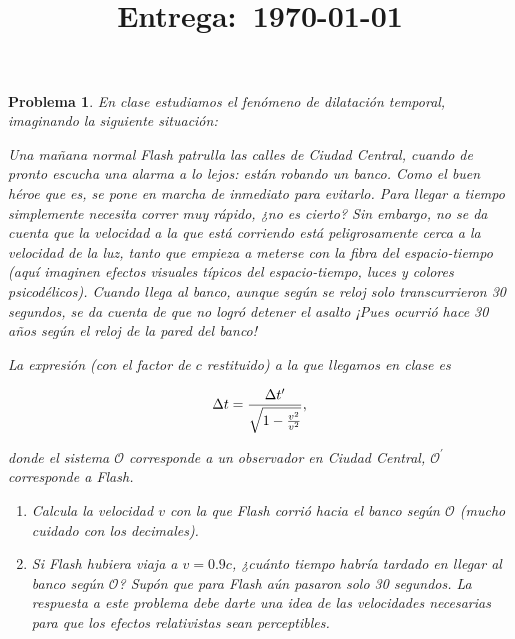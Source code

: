 \documentclass[12pt]{article}
\title{
    \textbf{\homeworknumber}\\
    \normalsize\vspace{0.1in}\small{\textbf{Entrega}:~\today}
    \vspace{-1.5in}
}
\author{}
\date{}
\theoremstyle{break}
\newtheorem{exercise}{Problema}
\theoremstyle{nonumberbreak}
\newcommand*{\observer}{\mathcal{O}}
\newcommand*{\primeobserver}{\mathcal{O}^{\prime}}
\begin{document}
    \maketitle
    \thispagestyle{fancy}
    
    \begin{exercise}
        En clase estudiamos el fenómeno de dilatación temporal, imaginando la siguiente situación:\par

        Una mañana normal Flash patrulla las calles de Ciudad Central, cuando de pronto escucha una alarma a lo lejos: están robando un banco. Como el buen héroe que es, se pone en marcha de inmediato para evitarlo. Para llegar a tiempo simplemente necesita correr muy rápido, ¿no es cierto? Sin embargo, no se da cuenta que la velocidad a la que está corriendo está peligrosamente cerca a la velocidad de la luz, tanto que empieza a meterse con la fibra del espacio-tiempo (aquí imaginen efectos visuales típicos del espacio-tiempo, luces y colores psicodélicos). Cuando llega al banco, aunque según se reloj solo transcurrieron 30 segundos, se da cuenta de que no logró detener el asalto ¡Pues ocurrió hace 30 años según el reloj de la pared del banco!\par

        La expresión (con el factor de \(c\) restituido) a la que llegamos en clase es

        \begin{equation*}
            \change{t} = \dfrac{\change*{t}}{\sqrt{1 - \frac{v^{2}}{v^{2}}}},
        \end{equation*}

        donde el sistema \(\observer\) corresponde a un observador en Ciudad Central, \(\primeobserver\) corresponde a Flash.

        \begin{enumerate}[label = \alph*)]
            \item Calcula la velocidad \(v\) con la que Flash corrió hacia el banco según \(\observer\) (mucho cuidado con los decimales).
            \item Si Flash hubiera viaja a \(v = 0.9c\), ¿cuánto tiempo habría tardado en llegar al banco según \(\observer\)? Supón que para Flash aún pasaron solo 30 segundos. La respuesta a este problema debe darte una idea de las velocidades necesarias para que los efectos relativistas sean perceptibles.
        \end{enumerate}
    \end{exercise}
\end{document}
